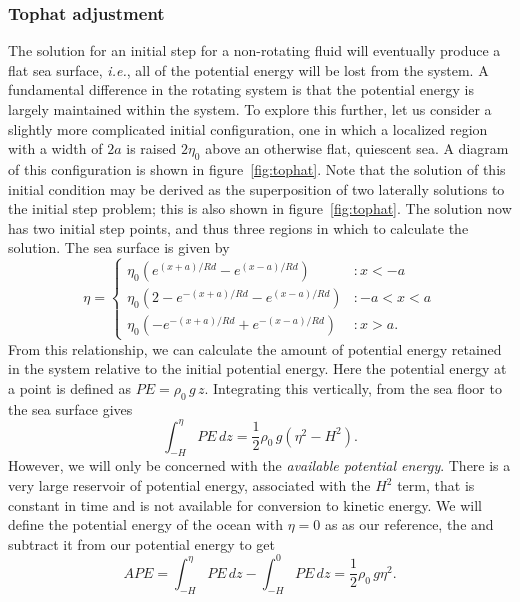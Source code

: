\documentclass[11pt]{report}
\numberwithin{equation}{section}
\begin{document}
\subsubsection{Tophat adjustment}
The solution for an initial step for a non-rotating fluid will eventually produce a flat sea surface, \emph{i.e.}, all of the potential energy will be lost from the system.  A fundamental difference in the rotating system is that the potential energy is largely maintained within the system.  To explore this further, let us consider a slightly more complicated initial configuration, one in which a localized region with a width of $2a$ is raised $2\eta_0$ above an otherwise flat, quiescent sea.  A diagram of this configuration is shown in figure~\ref{fig:tophat}.  Note that the solution of this initial condition may be derived as the superposition of two laterally solutions to the initial step problem; this is also shown in figure~\ref{fig:tophat}.  The solution now has two initial step points, and thus three regions in which to calculate the solution.  The sea surface is given by
\begin{displaymath}
    \label{eq:tophat-solution}
    \eta =
    \begin{cases}
        \eta_0 \left( e^{(x+a)/Rd} - e^{(x-a)/Rd} \right)       & :  x < -a \\
        \eta_0 \left( 2 - e^{-(x+a)/Rd} - e^{(x-a)/Rd} \right)  & :  -a < x < a \\
        \eta_0 \left( -e^{-(x+a)/Rd} + e^{-(x-a)/Rd} \right)    & :  x > a .
    \end{cases}
\end{displaymath}
From this relationship, we can calculate the amount of potential energy retained in the system relative to the initial potential energy.  Here the potential energy at a point is defined as $PE = \rho_0\,g\,z$.  Integrating this vertically, from the sea floor to the sea surface gives
\begin{equation}
    \int_{-H}^{\eta} PE\,dz = \frac{1}{2}\rho_0\,g ( \eta^2 - H^2).
\end{equation}
However, we will only be concerned with the {\it available potential energy}.  There is a very large reservoir of potential energy, associated with the $H^2$ term, that is constant in time and is not available for conversion to kinetic energy.  We will define the potential energy of the ocean with $\eta=0$ as as our reference, the  and subtract it from our potential energy to get
\begin{equation}
    APE = \int_{-H}^{\eta} PE\,dz - \int_{-H}^{0} PE\,dz = \frac{1}{2}\rho_0\,g \eta^2.
\end{equation}
\end{document}

